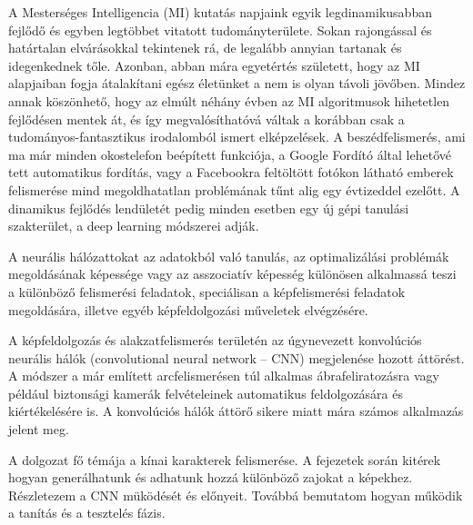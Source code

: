 
A Mesterséges Intelligencia (MI) kutatás napjaink egyik legdinamikusabban fejlődő és egyben legtöbbet vitatott tudományterülete. Sokan rajongással és határtalan elvárásokkal tekintenek rá, de legalább annyian tartanak és idegenkednek tőle. Azonban, abban mára egyetértés született, hogy az MI alapjaiban fogja átalakítani egész életünket a nem is olyan távoli jövőben. Mindez annak köszönhető, hogy az elmúlt néhány évben az MI algoritmusok hihetetlen fejlődésen mentek át, és így megvalósíthatóvá váltak a korábban csak a tudományos-fantasztikus irodalomból ismert elképzelések. A beszédfelismerés, ami ma már minden okostelefon beépített funkciója, a Google Fordító által lehetővé tett automatikus fordítás, vagy a Facebookra feltöltött fotókon látható emberek felismerése mind megoldhatatlan problémának tűnt alig egy évtizeddel ezelőtt. A dinamikus fejlődés lendületét pedig minden esetben egy új gépi tanulási szakterület, a deep learning módszerei adják.

A neurális hálózattokat az adatokból való tanulás, az optimalizálási problémák megoldásának képessége vagy az asszociatív képesség különösen alkalmassá teszi a különböző felismerési feladatok, speciálisan a képfelismerési feladatok megoldására, illetve egyéb képfeldolgozási műveletek elvégzésére.

A képfeldolgozás és alakzatfelismerés területén az úgynevezett konvolúciós neurális hálók (convolutional neural network – CNN) megjelenése hozott áttörést. A módszer a már említett arcfelismerésen túl alkalmas ábrafeliratozásra vagy például biztonsági kamerák felvételeinek automatikus feldolgozására és kiértékelésére is. A konvolúciós hálók áttörő sikere miatt mára számos alkalmazás jelent meg.

A dolgozat fő témája a kínai karakterek felismerése. A fejezetek során kitérek hogyan generálhatunk és adhatunk hozzá különböző zajokat a képekhez. Részletezem a CNN müködését és előnyeit. Továbbá bemutatom hogyan működik a tanítás és a tesztelés fázis.

\begin{comment}{Ez így kicsit általános, de elég lesz a végén átfogalmazni.}
\end{comment}
